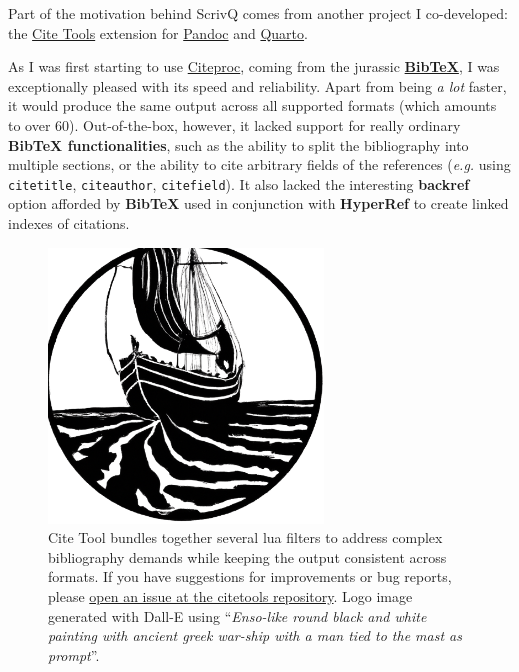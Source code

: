 \documentclass[
  12pt,
  a4paper,
  oneside,
  titlepage,
  toclink=all,
  toc=bibliography]{scrbook}
\theoremstyle{definition}
\theoremstyle{plain}
\theoremstyle{plain}
\theoremstyle{plain}
\theoremstyle{plain}
\theoremstyle{definition}
\theoremstyle{definition}
\theoremstyle{plain}
\theoremstyle{remark}
\begin{document}
Part of the motivation behind ScrivQ comes from another project I
co-developed: the
\href{https://bcdavasconcelos.github.io/citetools}{Cite Tools} extension
for \href{https://pandoc.org}{Pandoc} and
\href{https://quarto.org}{Quarto}.

As I was first starting to use
\href{https://en.wikipedia.org/wiki/CiteProc}{Citeproc}, coming from the
jurassic
\textbf{\href{https://en.wikipedia.org/wiki/BibTeX\#Entry_types}{BibTeX}},
I was exceptionally pleased with its speed and reliability. Apart from
being \emph{a lot} faster, it would produce the same output across all
supported formats (which amounts to over 60). Out-of-the-box, however,
it lacked support for really ordinary \textbf{BibTeX functionalities},
such as the ability to split the bibliography into multiple sections, or
the ability to cite arbitrary fields of the references (\emph{e.g.}
using \texttt{citetitle}, \texttt{citeauthor}, \texttt{citefield}). It
also lacked the interesting \textbf{backref} option afforded by
\textbf{BibTeX} used in conjunction with \textbf{HyperRef} to create
linked indexes of citations.

\begin{figure}

{\centering \includegraphics[width=2.875in,height=2.875in]{citetools.png}

}

\caption{\label{fig-scriv42}Cite Tool bundles together several lua
filters to address complex bibliography demands while keeping the output
consistent across formats. If you have suggestions for improvements or
bug reports, please
\href{https://github.com/bcdavasconcelos/citetools/issues/new/choose}{open
an issue at the citetools repository}. Logo image generated with Dall-E
using \enquote{\emph{Enso-like round black and white painting with
ancient greek war-ship with a man tied to the mast as prompt}}.}

\end{figure}
\end{document}
